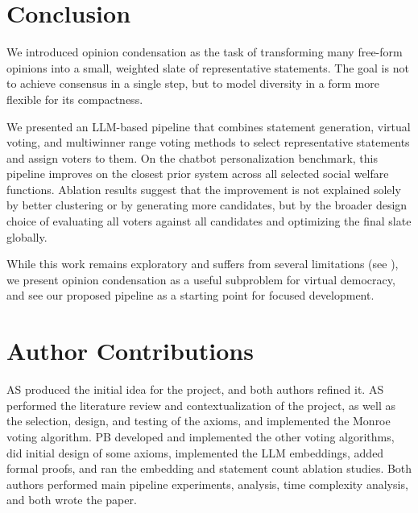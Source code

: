 \documentclass[11pt]{article}
\begin{document}
\section{Conclusion}

We introduced opinion condensation as the task of transforming many free-form opinions into a small, weighted slate of representative statements. The goal is not to achieve consensus in a single step, but to model  diversity in a form more flexible for its compactness.

We presented an LLM-based pipeline that combines statement generation, virtual voting, and multiwinner range voting methods to select representative statements and assign voters to them. On the chatbot personalization benchmark, this pipeline improves on the closest prior system across all selected social welfare functions. Ablation results suggest that the improvement is not explained solely by better clustering or by generating more candidates, but by the broader design choice of evaluating all voters against all candidates and optimizing the final slate globally.

While this work remains exploratory and suffers from several limitations (see ), we present opinion condensation as a useful subproblem for virtual democracy, and see our proposed pipeline as a starting point for focused development.

\section*{Author Contributions}

AS produced the initial idea for the project, and both authors refined it. AS performed the literature review and contextualization of the project, as well as the selection, design, and testing of the axioms, and implemented the Monroe voting algorithm. PB developed and implemented the other voting algorithms, did initial design of some axioms, implemented the LLM embeddings, added formal proofs, and ran the embedding and statement count ablation studies. Both authors performed main pipeline experiments, analysis, time complexity analysis, and both wrote the paper.
\end{document}

